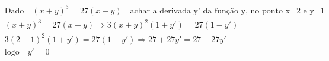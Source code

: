 \begin{ex}
\begin{align}
&\text{Dado}\quad (x+y)^3=27(x-y)\quad \text{achar a derivada y' da função y, no ponto x=2 e y=1}\nonumber\\
&(x+y)^3=27(x-y) \Rightarrow 3(x+y)^2(1+y') = 27(1-y')\nonumber\\
&3(2+1)^2(1+y')=27(1-y') \Rightarrow 27+27y'=27-27y'\nonumber\\
&\text{logo} \quad y'=0\nonumber
\end{align}
\end{ex}